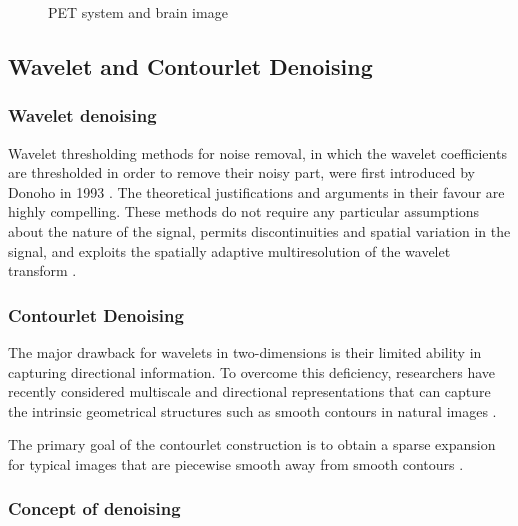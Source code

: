 \begin{figure}[h]
\begin{subfigure}[b]{0.35\textwidth}
		\label{fig:pet_brain}
	\end{subfigure}
	\caption[PET Denoising - \gls{pet} system and \gls{pet} brain image]{PET system and brain image}\label{fig:pet_image}
\end{figure}


\subsection{Wavelet and Contourlet Denoising}
\label{subsection:wavelet_denoising}

\subsubsection*{Wavelet denoising}
Wavelet thresholding methods for noise removal, in which the wavelet coefficients are
thresholded in order to remove their noisy part, were first introduced by Donoho in 1993 \cite{coifman1995translation}.
The theoretical justifications and arguments in their favour are highly compelling. These
methods do not require any particular assumptions about the nature of the signal, permits
discontinuities and spatial variation in the signal, and exploits the spatially adaptive
multiresolution of the wavelet transform \cite{cohen2012signal}.

\subsubsection*{Contourlet Denoising}
The major drawback for wavelets in two-dimensions is
their limited ability in capturing directional information. To
overcome this deficiency, researchers have recently considered multiscale and directional representations that can capture the
intrinsic geometrical structures such as smooth contours in
natural images \cite{Po2003}.

The primary goal of the contourlet construction is to obtain a sparse expansion for typical images that
are piecewise smooth away from smooth contours \cite{do2005contourlet}.

\subsubsection*{Concept of denoising}

